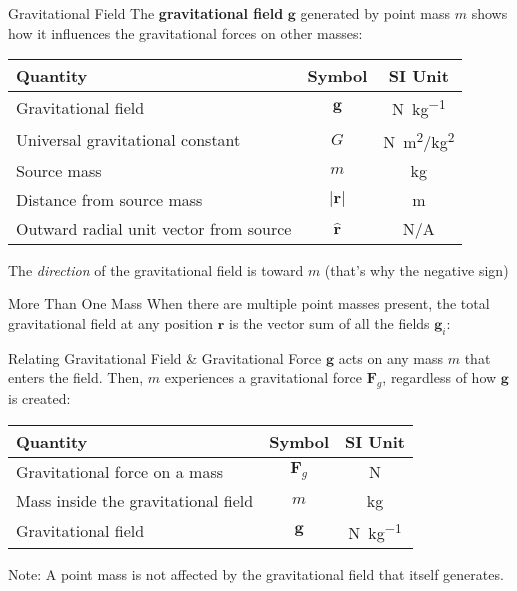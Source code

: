 \documentclass[12pt,compress,aspectratio=169]{beamer}
\begin{document}
\begin{frame}{Gravitational Field}
  The \textbf{gravitational field} $\bm{g}$ generated by point mass $m$
  shows how it influences the gravitational forces on other masses:

  \begin{center}
    \begin{tabular}{l|c|c}
      \rowcolor{pink}
      \textbf{Quantity} & \textbf{Symbol} & \textbf{SI Unit} \\ \hline
      Gravitational field       & $\bm{g}$ & \si{\newton\per\kilo\gram}\\
      Universal gravitational constant
      & $G$ & \si{\newton\metre^2/\kilo\gram^2} \\
      Source mass               & $m$ & \si{\kilo\gram} \\
      Distance from source mass & $|\bm{r}|$ & \si{\metre}\\
      Outward radial unit vector from source & $\hat{\bm{r}}$ & N/A
    \end{tabular}
  \end{center}
  The \emph{direction} of the gravitational field is toward $m$ (that's why the
  negative sign)
\end{frame}



\begin{frame}{More Than One Mass}
  When there are multiple point masses present, the total gravitational field
  at any position $\bm{r}$ is the vector sum of all the fields $\bm{g}_i$:
    
\end{frame}




\begin{frame}{Relating Gravitational Field \& Gravitational Force}
  $\bm{g}$ acts on any mass $m$ that enters the field. Then, $m$ experiences a
  gravitational force $\bm{F}_g$, regardless of how $\bm{g}$ is created:

  \begin{center}
    \begin{tabular}{l|c|c}
      \rowcolor{pink}
      \textbf{Quantity} & \textbf{Symbol} & \textbf{SI Unit} \\ \hline
      Gravitational force on a mass & $\bm{F}_g$ & \si{\newton} \\
      Mass inside the gravitational field & $m$ & \si{\kilo\gram}\\
      Gravitational field & $\bm{g}$   & \si{\newton\per\kilogram}
    \end{tabular}
  \end{center}
  Note: A point mass is not affected by the gravitational field that itself
  generates.
\end{frame}
\end{document}
